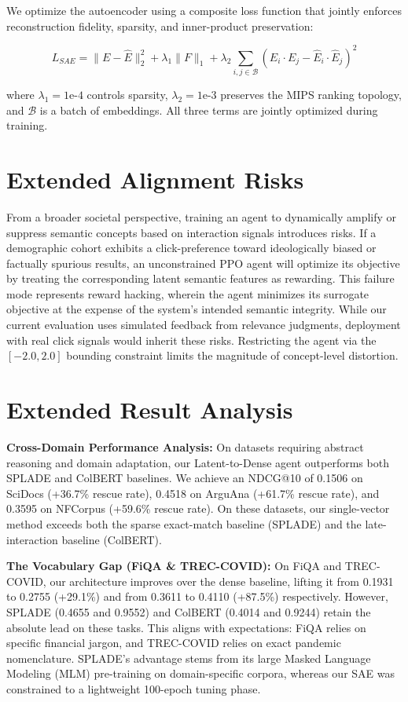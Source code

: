 \documentclass[sigconf]{acmart}
\begin{document}
We optimize the autoencoder using a composite loss function that jointly enforces reconstruction fidelity, sparsity, and inner-product preservation:

\begin{equation}
L_{SAE} = \|E - \hat{E}\|_2^2 + \lambda_1 \|F\|_1 + \lambda_2 \sum_{i,j \in \mathcal{B}} (E_i \cdot E_j - \hat{E}_i \cdot \hat{E}_j)^2
\end{equation}

where $\lambda_1 = 1\text{e-}4$ controls sparsity, $\lambda_2 = 1\text{e-}3$ preserves the MIPS ranking topology, and $\mathcal{B}$ is a batch of embeddings. All three terms are jointly optimized during training.

\section{Extended Alignment Risks}

From a broader societal perspective, training an agent to dynamically amplify or suppress semantic concepts based on interaction signals introduces risks. If a demographic cohort exhibits a click-preference toward ideologically biased or factually spurious results, an unconstrained PPO agent will optimize its objective by treating the corresponding latent semantic features as rewarding. This failure mode represents reward hacking, wherein the agent minimizes its surrogate objective at the expense of the system's intended semantic integrity. While our current evaluation uses simulated feedback from relevance judgments, deployment with real click signals would inherit these risks. Restricting the agent via the $[-2.0, 2.0]$ bounding constraint limits the magnitude of concept-level distortion.

\section{Extended Result Analysis}

\textbf{Cross-Domain Performance Analysis:} On datasets requiring abstract reasoning and domain adaptation, our Latent-to-Dense agent outperforms both SPLADE and ColBERT baselines. We achieve an NDCG@10 of 0.1506 on SciDocs (+36.7\% rescue rate), 0.4518 on ArguAna (+61.7\% rescue rate), and 0.3595 on NFCorpus (+59.6\% rescue rate). On these datasets, our single-vector method exceeds both the sparse exact-match baseline (SPLADE) and the late-interaction baseline (ColBERT).

\textbf{The Vocabulary Gap (FiQA \& TREC-COVID):} On FiQA and TREC-COVID, our architecture improves over the dense baseline, lifting it from 0.1931 to 0.2755 (+29.1\%) and from 0.3611 to 0.4110 (+87.5\%) respectively. However, SPLADE (0.4655 and 0.9552) and ColBERT (0.4014 and 0.9244) retain the absolute lead on these tasks. This aligns with expectations: FiQA relies on specific financial jargon, and TREC-COVID relies on exact pandemic nomenclature. SPLADE's advantage stems from its large Masked Language Modeling (MLM) pre-training on domain-specific corpora, whereas our SAE was constrained to a lightweight 100-epoch tuning phase.
\end{document}
